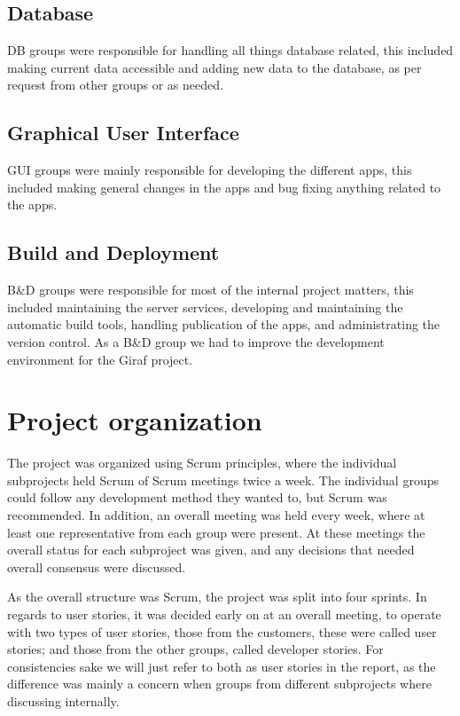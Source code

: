 \subsection{Database}
DB groups were responsible for handling all things database related, this included making current data accessible and adding new data to the database, as per request from other groups or as needed.

\subsection{Graphical User Interface}
GUI groups were mainly responsible for developing the different apps, this included making general changes in the apps and bug fixing anything related to the apps.

\subsection{Build and Deployment}
B\&D groups were responsible for most of the internal project matters, this included maintaining the server services, developing and maintaining the automatic build tools, handling publication of the apps, and administrating the version control. As a B\&D group we had to improve the development environment for the Giraf project.


\section{Project organization}
The project was organized using Scrum principles, where the individual subprojects held Scrum of Scrum meetings twice a week. The individual groups could follow any development method they wanted to, but Scrum was recommended.
In addition, an overall meeting was held every week, where at least one representative from each group were present. At these meetings the overall status for each subproject was given, and any decisions that needed overall consensus were discussed.

As the overall structure was Scrum, the project was split into four sprints. In regards to user stories, it was decided early on at an overall meeting, to operate with two types of user stories, those from the customers, these were called user stories; and those from the other groups, called developer stories. For consistencies sake we will just refer to both as user stories in the report, as the difference was mainly a concern when groups from different subprojects where discussing internally.

